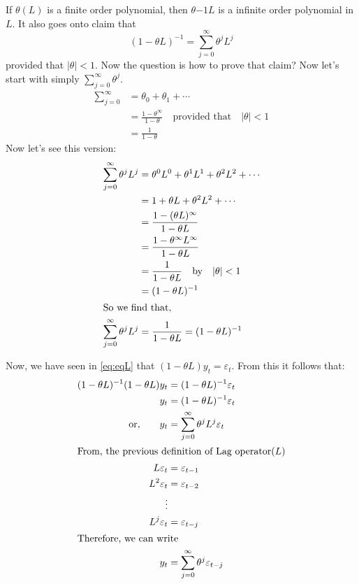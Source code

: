 \documentclass{book}
\begin{document}
If $\theta(L)$ is a finite order polynomial, then $\theta{-1}L$ is a infinite order polynomial in $L$. It also goes onto claim that
\begin{equation}
    (1-\theta L)^{-1}=\sum_{j=0}^{\infty}\theta^j L^j
    \label{eq:lagpol2}
\end{equation}
provided that $|\theta|<1$. Now the question is how to prove that claim? 
Now let's start with simply $\sum_{j=0}^\infty \theta^j$. 
\begin{align}
    \sum_{j=0}^\infty & = \theta_0+\theta_1+\dotsb \\
    & =\frac{1-\theta^\infty}{1-\theta} \quad \text{provided that} \quad |\theta|<1 \\
    &=\frac{1}{1-\theta}
    \label{eq:eqthet}
\end{align}
Now let's see this version:
\begin{align}
    \sum_{j=0}^\infty \theta^j L^j & = \theta^0 L^0+ \theta^1 L^1 + \theta^2 L^2+ \dotsb \\
    & = 1+\theta L + \theta^2 L^2+\dotsb \\
    & = \frac{1-(\theta L)^\infty}{1-\theta L} \\
    & = \frac{1-\theta^\infty L^\infty}{1-\theta L} \\
    & = \frac{1}{1-\theta L} \quad \text{by} \quad |\theta|<1\\
    & = (1-\theta L)^{-1} \\
    \intertext{So we find that,}
    \sum_{j=0}^\infty \theta^j L^j & = \frac{1}{1-\theta L}=(1-\theta L)^{-1}
    \label{eqthl}
\end{align}

Now, we have seen in \ref{eq:eqL} that $(1-\theta L)y_t=\varepsilon_t$. From this it follows that:
\begin{align}
    (1-\theta L)^{-1}(1-\theta L) y_t & = (1-\theta L)^{-1} \varepsilon_t \\
    y_t & = (1-\theta L)^{-1} \varepsilon_t \\
    \text{or,} \qquad y_t & = \sum_{j=0}^\infty \theta^j L^j \varepsilon_t \\
    \intertext{From, the previous definition of Lag operator($L$)}
    L\varepsilon_t & = \varepsilon_{t-1} \\
    L^2 \varepsilon_t & =\varepsilon_{t-2} \\
    \vdots \\
    L^j \varepsilon_t &= \varepsilon_{t-j} \\
    \intertext{Therefore, we can write}
    y_t & = \sum_{j=0}^\infty \theta^j \varepsilon_{t-j}
    \label{}
\end{align}
\end{document}
